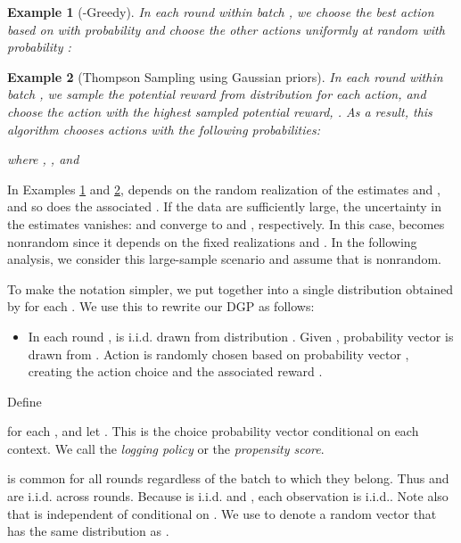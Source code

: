 \documentclass[letterpaper]{article} \usepackage{aaai19}  \usepackage{times}  \usepackage{helvet}  \usepackage{courier}  \usepackage{url}  \usepackage{graphicx}  \frenchspacing  \usepackage{comment}
\newtheorem{example}{Example}
\begin{document}
\begin{example}[-Greedy]\label{ex:e-greedy}
	In each round within batch , we choose the best action based on  with probability  and choose the other actions uniformly at random with probability :
	
\end{example}



\begin{example}[Thompson Sampling using Gaussian priors]\label{ex:Thompson}
	In each round within batch , we sample the potential reward  from distribution  for each action, and choose the action with the highest sampled potential reward, .
	As a result, this algorithm chooses actions with the following probabilities:
	
	where , , and
	
\end{example}

In Examples \ref{ex:e-greedy} and \ref{ex:Thompson},  depends on the random realization of the estimates  and , and so does the associated .
If the data are sufficiently large, the uncertainty in the estimates vanishes:  and  converge to  and , respectively. 
In this case,  becomes nonrandom since it depends on the fixed realizations  and .
In the following analysis, we consider this large-sample scenario and assume that  is nonrandom.


To make the notation simpler, we put  together into a single distribution  obtained by  for each .
We use this to rewrite our DGP as follows:

\begin{itemize}
	\item In each round ,  is i.i.d. drawn from distribution .
	Given , probability vector  is drawn from . 
	Action is randomly chosen based on probability vector , creating the action choice  and the associated reward . 
\end{itemize}

Define

for each , and let .
This is the choice probability vector conditional on each context.
We call  the {\it logging policy} or the {\it propensity score}.

 is common for all rounds regardless of the batch to which they belong. 
Thus  and  are i.i.d. across rounds.
Because  is i.i.d. and , each observation  is i.i.d..
Note also that  is independent of  conditional on .
We use  to denote a random vector that has the same distribution as .
\end{document}
